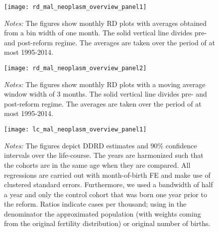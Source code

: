 \begin{landscape}
\begin{figure}[H]
	\centering
	\begin{minipage}{.95\linewidth}
	\texttt{[image: rd\_mal\_neoplasm\_overview\_panel1]}
	{\scriptsize \emph{Notes:} The figures show monthly RD plots with averages obtained from a bin width of one month. The solid vertical line divides pre- and post-reform regime. The averages are taken over the period of at most 1995-2014. \par}
\end{minipage}
\end{figure}
\end{landscape}
\begin{landscape}
\begin{figure}[H]
	\centering
\begin{minipage}{.95\linewidth}
	\texttt{[image: rd\_mal\_neoplasm\_overview\_panel2]}
	{\scriptsize \emph{Notes:} The figures show monthly RD plots with a moving average window width of 3 months. The solid vertical line divides pre- and post-reform regime. The averages are taken over the period of at most 1995-2014. \par}
\end{minipage}
\end{figure}
\end{landscape}


\begin{landscape}
\begin{figure}[H]
\centering
\begin{minipage}{.9\linewidth}
\texttt{[image: lc\_mal\_neoplasm\_overview\_panel1]}
{\scriptsize \emph{Notes:} The figures depict DDRD estimates and 90\% confidence intervals over the life-course. The years are harmonized such that the cohorts are in the same age when they are compared. All regressions are carried out with month-of-birth FE and make use of clustered standard errors. Furthermore, we used a bandwidth of half a year and only the control cohort that was born one year prior to the reform. Ratios indicate cases per thousand; using in the denominator the approximated population (with weights coming from the original fertility distribution) or original number of births. \par}
\end{minipage}
\end{figure}
\end{landscape}
